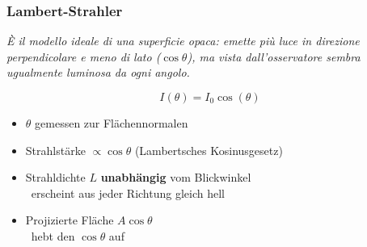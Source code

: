 \subsubsection{Lambert-Strahler}
\textit{È il modello ideale di una superficie opaca: emette più luce in direzione perpendicolare e meno di lato ($\cos\theta$), ma vista dall'osservatore sembra ugualmente luminosa da ogni angolo.}

\smallskip
\begin{minipage}{0.40\columnwidth}
    \centering
\end{minipage}
\hfill
\begin{minipage}{0.58\columnwidth}
    $$ \boxed{ I(\theta) = I_0 \cos (\theta) } $$

    \begin{itemize}
        \item $\theta$ gemessen zur Flächennormalen
        \item Strahlstärke $\propto \cos\theta$ (Lambertsches Kosinusgesetz)
        \item Strahldichte $L$ \textbf{unabhängig} vom Blickwinkel \\
            \textrightarrow\  erscheint aus jeder Richtung gleich hell
        \item Projizierte Fläche $A\cos\theta$ \\ \textrightarrow\  hebt den $\cos\theta$ auf
    \end{itemize}
\end{minipage}

